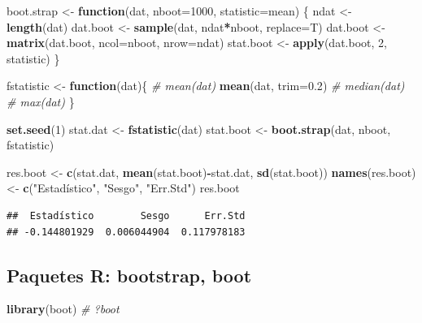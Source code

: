 \documentclass[]{book}
\newenvironment{Shaded}{\begin{snugshade}}{\end{snugshade}}
\newcommand{\KeywordTok}[1]{\textcolor[rgb]{0.13,0.29,0.53}{\textbf{#1}}}
\newcommand{\DataTypeTok}[1]{\textcolor[rgb]{0.13,0.29,0.53}{#1}}
\newcommand{\DecValTok}[1]{\textcolor[rgb]{0.00,0.00,0.81}{#1}}
\newcommand{\FloatTok}[1]{\textcolor[rgb]{0.00,0.00,0.81}{#1}}
\newcommand{\StringTok}[1]{\textcolor[rgb]{0.31,0.60,0.02}{#1}}
\newcommand{\CommentTok}[1]{\textcolor[rgb]{0.56,0.35,0.01}{\textit{#1}}}
\newcommand{\ControlFlowTok}[1]{\textcolor[rgb]{0.13,0.29,0.53}{\textbf{#1}}}
\newcommand{\OperatorTok}[1]{\textcolor[rgb]{0.81,0.36,0.00}{\textbf{#1}}}
\newcommand{\NormalTok}[1]{#1}
\theoremstyle{definition}
\theoremstyle{definition}
\theoremstyle{definition}
\theoremstyle{remark}
\begin{document}
\begin{Shaded}
\begin{Highlighting}[]
\NormalTok{boot.strap <-}\StringTok{ }\ControlFlowTok{function}\NormalTok{(dat, }\DataTypeTok{nboot=}\DecValTok{1000}\NormalTok{, }\DataTypeTok{statistic=}\NormalTok{mean)}
\NormalTok{\{}
\NormalTok{  ndat <-}\StringTok{ }\KeywordTok{length}\NormalTok{(dat)}
\NormalTok{  dat.boot <-}\StringTok{ }\KeywordTok{sample}\NormalTok{(dat, ndat}\OperatorTok{*}\NormalTok{nboot, }\DataTypeTok{replace=}\NormalTok{T)}
\NormalTok{  dat.boot <-}\StringTok{ }\KeywordTok{matrix}\NormalTok{(dat.boot, }\DataTypeTok{ncol=}\NormalTok{nboot, }\DataTypeTok{nrow=}\NormalTok{ndat)}
\NormalTok{  stat.boot <-}\StringTok{ }\KeywordTok{apply}\NormalTok{(dat.boot, }\DecValTok{2}\NormalTok{, statistic)}
\NormalTok{\}}

\NormalTok{fstatistic <-}\StringTok{ }\ControlFlowTok{function}\NormalTok{(dat)\{}
  \CommentTok{#  mean(dat)}
  \KeywordTok{mean}\NormalTok{(dat, }\DataTypeTok{trim=}\FloatTok{0.2}\NormalTok{)}
  \CommentTok{#  median(dat)}
  \CommentTok{#  max(dat)}
\NormalTok{\}}

\KeywordTok{set.seed}\NormalTok{(}\DecValTok{1}\NormalTok{)}
\NormalTok{stat.dat <-}\StringTok{ }\KeywordTok{fstatistic}\NormalTok{(dat)}
\NormalTok{stat.boot <-}\StringTok{ }\KeywordTok{boot.strap}\NormalTok{(dat, nboot, fstatistic)}

\NormalTok{res.boot <-}\StringTok{ }\KeywordTok{c}\NormalTok{(stat.dat, }\KeywordTok{mean}\NormalTok{(stat.boot)}\OperatorTok{-}\NormalTok{stat.dat, }\KeywordTok{sd}\NormalTok{(stat.boot))}
\KeywordTok{names}\NormalTok{(res.boot) <-}\StringTok{ }\KeywordTok{c}\NormalTok{(}\StringTok{"Estadístico"}\NormalTok{, }\StringTok{"Sesgo"}\NormalTok{, }\StringTok{"Err.Std"}\NormalTok{)}
\NormalTok{res.boot}
\end{Highlighting}
\end{Shaded}

\begin{verbatim}
##  Estadístico        Sesgo      Err.Std 
## -0.144801929  0.006044904  0.117978183
\end{verbatim}

\subsection{Paquetes R: bootstrap,
boot}\label{paquetes-r-bootstrap-boot}

\begin{Shaded}
\begin{Highlighting}[]
\KeywordTok{library}\NormalTok{(boot)}
\CommentTok{# ?boot}
\end{Highlighting}
\end{Shaded}
\end{document}
